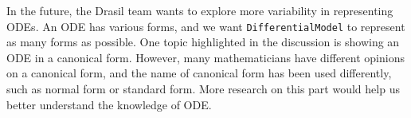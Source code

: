 In the future, the Drasil team wants to explore more variability in representing ODEs. An ODE has various forms, and we want \verb|DifferentialModel| to represent as many forms as possible. One topic highlighted in the discussion is showing an ODE in a canonical form. However, many mathematicians have different opinions on a canonical form, and the name of canonical form has been used differently, such as normal form or standard form. More research on this part would help us better understand the knowledge of ODE.
